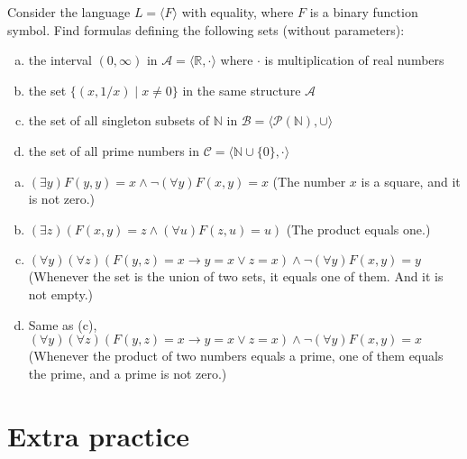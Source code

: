 \begin{problem}

    Consider the language $L=\langle F \rangle$ with equality, where $F$ is a binary function symbol. Find formulas defining the following sets (without parameters):
    \begin{enumerate}[(a)]
        \item the interval $(0,\infty)$ in $\mathcal A=\langle\mathbb R, \cdot\rangle$ where $\cdot$ is multiplication of real numbers
        \item the set $\{(x, 1/x)\mid x\neq 0\}$ in the same structure $\mathcal A$
        \item the set of all singleton subsets of $\mathbb N$ in $\mathcal B=\langle\mathcal P(\mathbb N),\cup\rangle$
        \item the set of all prime numbers in $\mathcal C=\langle \mathbb N\cup\{0\}, \cdot\rangle$
    \end{enumerate}

    \begin{solution}

        \begin{enumerate}[(a)]
            \item $(\exists y)F(y,y)=x\land \neg (\forall y)F(x,y)=x$ (The number $x$ is a square, and it is not zero.)
            \item $(\exists z)(F(x,y)=z\land(\forall u)F(z,u)=u)$ (The product equals one.)
            \item $(\forall y)(\forall z)(F(y,z)=x\to y=x\lor z=x)\land\neg(\forall y)F(x,y)=y$ (Whenever the set is the union of two sets, it equals one of them. And it is not empty.)
            \item Same as (c), $(\forall y)(\forall z)(F(y,z)=x\to y=x\lor z=x)\land\neg(\forall y)F(x,y)=x$ (Whenever the product of two numbers equals a prime, one of them equals the prime, and a prime is not zero.)
        \end{enumerate}
                    
    \end{solution}

\end{problem}

        
        
\section*{Extra practice}


